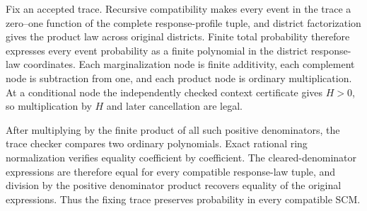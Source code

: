 Fix an accepted trace.  Recursive compatibility makes every event in the trace a zero--one function of the complete response-profile tuple, and district factorization gives the product law across original districts.  Finite total probability therefore expresses every event probability as a finite polynomial in the district response-law coordinates.  Each marginalization node is finite additivity, each complement node is subtraction from one, and each product node is ordinary multiplication.  At a conditional node the independently checked context certificate gives \(H>0\), so multiplication by \(H\) and later cancellation are legal.

After multiplying by the finite product of all such positive denominators, the trace checker compares two ordinary polynomials.  Exact rational ring normalization verifies equality coefficient by coefficient.  The cleared-denominator expressions are therefore equal for every compatible response-law tuple, and division by the positive denominator product recovers equality of the original expressions.  Thus the fixing trace preserves probability in every compatible SCM.